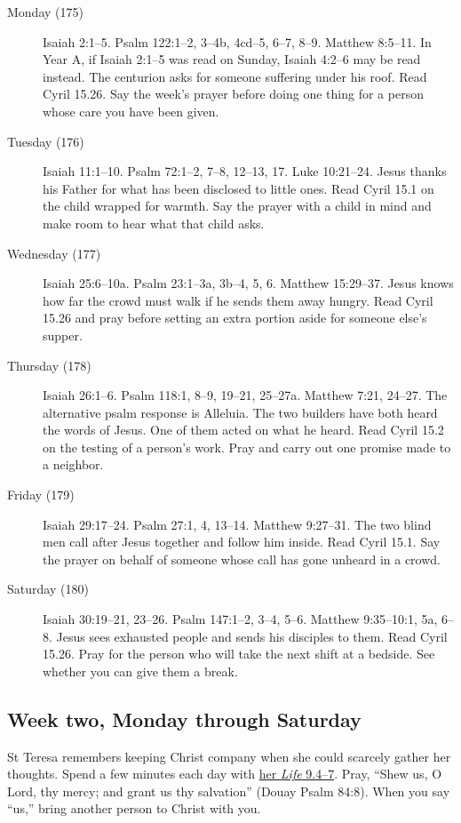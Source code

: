 \begin{description}
\item[Monday (175)] Isaiah 2:1--5. Psalm 122:1--2, 3--4b, 4cd--5,
6--7, 8--9. Matthew 8:5--11. In Year A, if Isaiah 2:1--5 was read on
Sunday, Isaiah 4:2--6 may be read instead. The centurion asks for
someone suffering under his roof. Read Cyril 15.26. Say the week's
prayer before doing one thing for a person whose care you have been given.
\item[Tuesday (176)] Isaiah 11:1--10. Psalm 72:1--2, 7--8, 12--13, 17.
Luke 10:21--24. Jesus thanks his Father for what has been disclosed to
little ones. Read Cyril 15.1 on the child wrapped for warmth. Say the
prayer with a child in mind and make room to hear what that child asks.
\item[Wednesday (177)] Isaiah 25:6--10a. Psalm 23:1--3a, 3b--4, 5, 6.
Matthew 15:29--37. Jesus knows how far the crowd must walk if he sends
them away hungry. Read Cyril 15.26 and pray before setting an extra
portion aside for someone else's supper.
\item[Thursday (178)] Isaiah 26:1--6. Psalm 118:1, 8--9, 19--21,
25--27a. Matthew 7:21, 24--27. The alternative psalm response is
Alleluia. The two builders have both heard the
words of Jesus. One of them acted on what he heard. Read Cyril 15.2
on the testing of a person's work. Pray and carry out one promise made
to a neighbor.
\item[Friday (179)] Isaiah 29:17--24. Psalm 27:1, 4, 13--14.
Matthew 9:27--31. The two blind men call after Jesus together and
follow him inside. Read Cyril 15.1. Say the prayer on behalf of someone
whose call has gone unheard in a crowd.
\item[Saturday (180)] Isaiah 30:19--21, 23--26. Psalm 147:1--2, 3--4, 5--6.
Matthew 9:35--10:1, 5a, 6--8. Jesus sees exhausted people and sends
his disciples to them. Read Cyril 15.26. Pray for the person who
will take the next shift at a bedside. See whether you can give them a break.
\end{description}

\subsection{Week two, Monday through Saturday}

St Teresa remembers keeping Christ company when she could scarcely
gather her thoughts. Spend a few minutes each day with
\href{https://ccel.org/ccel/teresa/life/life.viii.x.html}{her \emph{Life} 9.4--7}.
Pray, “Shew us, O Lord, thy mercy; and grant us thy salvation” (Douay
Psalm 84:8). When you say “us,” bring another person to Christ with you.

